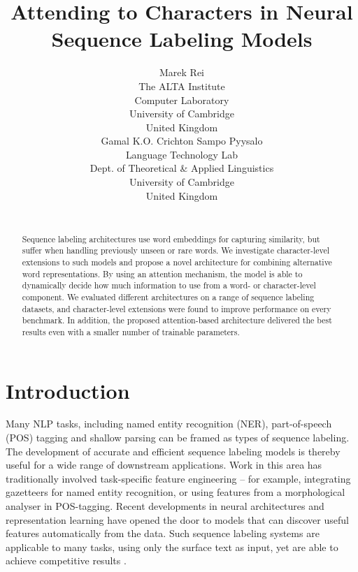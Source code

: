 \documentclass[11pt]{article}
\title{Attending to Characters in Neural Sequence Labeling Models}
\author{\hspace{-1.5cm}Marek Rei\\
        \hspace{-1.5cm}The ALTA Institute\\
        \hspace{-1.5cm}Computer Laboratory\\
        \hspace{-1.5cm}University of Cambridge\\
        \hspace{-1.5cm}United Kingdom\\
        \hspace{-1.5cm}{\tt marek.rei@cl.cam.ac.uk}
\And
        \hspace{-1.5cm}Gamal K.O. Crichton \hspace{1cm} Sampo Pyysalo\\
        \hspace{-1.5cm}Language Technology Lab\\
        \hspace{-1.5cm}Dept. of Theoretical \& Applied Linguistics\\
        \hspace{-1.5cm}University of Cambridge\\
        \hspace{-1.5cm}United Kingdom\\
        \hspace{-1.5cm}{\tt \{gkoc2,smp66\}@cam.ac.uk} \\}
\date{}
\begin{document}
\maketitle
\begin{abstract}

Sequence labeling architectures use word embeddings for capturing similarity, but suffer when handling previously unseen or rare words.
We investigate character-level extensions to such models and propose a novel architecture for combining alternative word representations.
By using an attention mechanism, the model is able to dynamically decide how much information to use from a word- or character-level component. 
We evaluated different architectures on a range of sequence labeling datasets, and character-level extensions were found to improve performance on every benchmark.
In addition, the proposed attention-based architecture delivered the best results even with a smaller number of trainable parameters.





\end{abstract}

\section{Introduction}


Many NLP tasks, including named entity recognition (NER), part-of-speech (POS) tagging and shallow parsing can be framed as types of sequence labeling. 
The development of accurate and efficient sequence labeling models is thereby useful for a wide range of downstream applications.
Work in this area has traditionally involved task-specific feature engineering -- for example, integrating gazetteers for named entity recognition, or using features from a morphological analyser in POS-tagging.
Recent developments in neural architectures and representation learning have opened the door to models that can discover useful features automatically from the data.
Such sequence labeling systems are applicable to many tasks, using only the surface text as input, yet are able to achieve competitive results \cite{Collobert2011,Irsoy2014a}.
\end{document}
